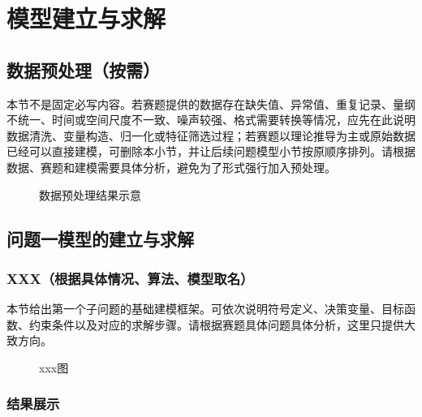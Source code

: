 \documentclass[12pt,a4paper]{article}
\begin{document}
\section{模型建立与求解}

\subsection{数据预处理（按需）}

本节不是固定必写内容。若赛题提供的数据存在缺失值、异常值、重复记录、量纲不统一、时间或空间尺度不一致、噪声较强、格式需要转换等情况，应先在此说明数据清洗、变量构造、归一化或特征筛选过程；若赛题以理论推导为主或原始数据已经可以直接建模，可删除本小节，并让后续问题模型小节按原顺序排列。请根据数据、赛题和建模需要具体分析，避免为了形式强行加入预处理。

\begin{figure}[H]
    \centering
    \caption{数据预处理结果示意}
    \label{fig:data-preprocess}
\end{figure}

\subsection{问题一模型的建立与求解}



\subsubsection{XXX（根据具体情况、算法、模型取名）}
本节给出第一个子问题的基础建模框架。可依次说明符号定义、决策变量、目标函数、约束条件以及对应的求解步骤。请根据赛题具体问题具体分析，这里只提供大致方向。
\begin{figure}[H]
    \centering
    \caption{xxx图}
    \label{fig:result}
\end{figure}

\subsubsection{结果展示}
\end{document}
